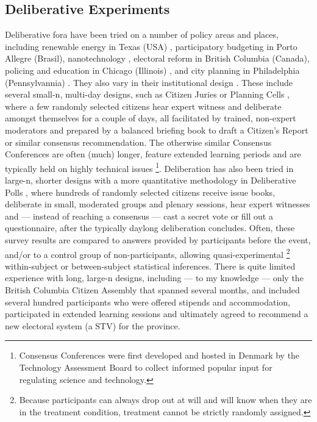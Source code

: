 \subsection{Deliberative Experiments}
Deliberative fora have been tried on a number of policy areas and places, including renewable energy in Texas (USA) \citep{LehrGuild-2003-aa}, participatory budgeting in Porto Allegre \citep{CoelhoPozzono-2005-aa} (Brasil), nanotechnology \citep{Powell2008}, electoral reform in British Columbia (Canada), policing and education in Chicago (Illinois) \citep{Citizen-2004-aa}, and city planning in Philadelphia (Pennsylvannia) \citep{Sokoloff2005}. 
They also vary in their institutional design \citep[reviewed in][]{Fung-2003-ac}.
These include several small-n, multi-day designs, such as Citizen Juries \citep{SmithWales-2000-aa} or Planning Cells \citep{Dienel-1999-aa}, where a few randomly selected citizens hear expert witness and deliberate amongst themselves for a couple of days, all facilitated by trained, non-expert moderators and prepared by a balanced briefing book to draft a Citizen's Report or similar consensus recommendation.
The otherwise similar Consensus Conferences \citep{Einsiedel2000} are often (much) longer, feature extended learning periods and are typically held on highly technical issues
\footnote{
	Consensus Conferences were first developed and hosted in Denmark by the Technology Assessment Board to collect informed popular input for regulating science and technology.
}.
Deliberation has also been tried in large-n, shorter designs with a more quantitative methodology in Deliberative Polls \citep{FishkinFarrar-2005-aa}, where hundreds of randomly selected citizens receive issue books, deliberate in small, moderated groups and plenary sessions, hear expert witnesses and --- instead of reaching a consensus --- cast a secret vote or fill out a questionnaire, after the typically daylong deliberation concludes. 
Often, these survey results are compared to answers provided by participants before the event, and/or to a control group of non-participants, allowing quasi-experimental
\footnote{
	Because participants can always drop out at will and will know when they are in the treatment condition, treatment cannot be strictly randomly assigned.
	}
within-subject or between-subject statistical inferences. 
There is quite limited experience with long, large-n designs, including --- to my knowledge --- only the British Columbia Citizen Assembly \citep{Citizen-2004-aa} that spanned several months, and included several hundred participants who were offered stipends and accommodation, participated in extended learning sessions and ultimately agreed to recommend a new electoral system (a \gls{STV}) for the province.

